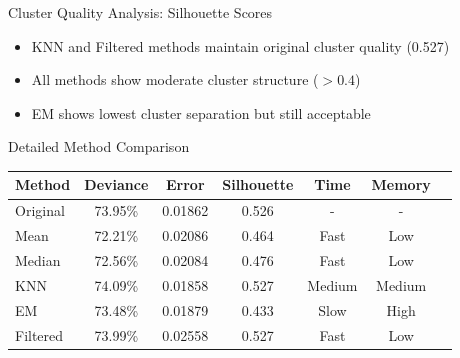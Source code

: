 \documentclass{beamer}
\begin{document}
\begin{frame}{Cluster Quality Analysis: Silhouette Scores}

    \begin{itemize}
        \item KNN and Filtered methods maintain original cluster quality (0.527)
        \item All methods show moderate cluster structure ($> 0.4$)
        \item EM shows lowest cluster separation but still acceptable
    \end{itemize}
\end{frame}

\begin{frame}{Detailed Method Comparison}
    \begin{table}
        \centering
        \begin{tabular}{lcccccc}
            \hline
            \textbf{Method} & \textbf{Deviance} & \textbf{Error} & \textbf{Silhouette} & \textbf{Time} & \textbf{Memory} \\
            \hline
            Original & 73.95\% & 0.01862 & 0.526 & - & - \\
            Mean & 72.21\% & 0.02086 & 0.464 & Fast & Low \\
            Median & 72.56\% & 0.02084 & 0.476 & Fast & Low \\
            KNN & 74.09\% & 0.01858 & 0.527 & Medium & Medium \\
            EM & 73.48\% & 0.01879 & 0.433 & Slow & High \\
            Filtered & 73.99\% & 0.02558 & 0.527 & Fast & Low \\
            \hline
        \end{tabular}
    \end{table}
\end{frame}
\end{document}

